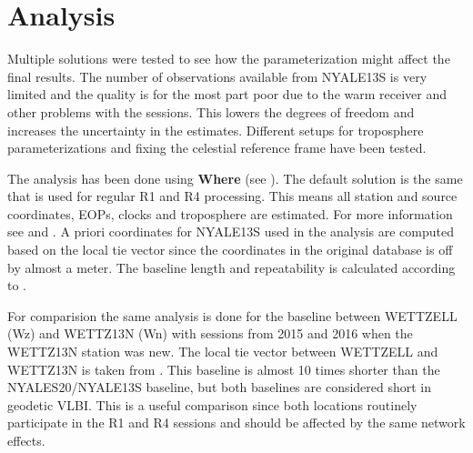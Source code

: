 \documentclass[natbib,twocolumn,twoside]{svmultiag}
\begin{document}

\section{Analysis}                                         
\label{sec:analysis}
Multiple solutions were tested to see how the parameterization might affect the final results. The number of observations
available from NYALE13S is very limited and the quality is for the most part poor due to the warm receiver and other
problems with the sessions. This lowers the degrees of freedom and increases the uncertainty in the estimates. Different
setups for troposphere parameterizations and fixing the celestial reference frame have been tested.

The analysis has been done using \textbf{Where} (see \cite{hjelle2018}). The default solution is the same that is used for 
regular R1 and R4 processing. This means all station and source coordinates, EOPs, clocks and troposphere are estimated. 
For more information see \cite{kirkvik2017b} and \cite{kirkvik2019}. A priori coordinates for NYALE13S used in the 
analysis are computed based on the local 
tie vector since the coordinates in the original database is off by almost a meter. The baseline length and repeatability 
is calculated according to \cite{hofmeister2016}.

For comparision the same analysis is done for the baseline between 
WETTZELL (Wz) and WETTZ13N (Wn) with sessions from 2015 and 2016 when the WETTZ13N station was new. The local tie vector 
between WETTZELL and WETTZ13N is taken from \cite{schuler2018}. This baseline is almost 10 times shorter than the 
NYALES20/NYALE13S baseline, but both baselines are considered short in geodetic VLBI. This is a useful comparison since
both locations routinely participate in the R1 and R4 sessions and should be affected by the same network effects.
\end{document}
